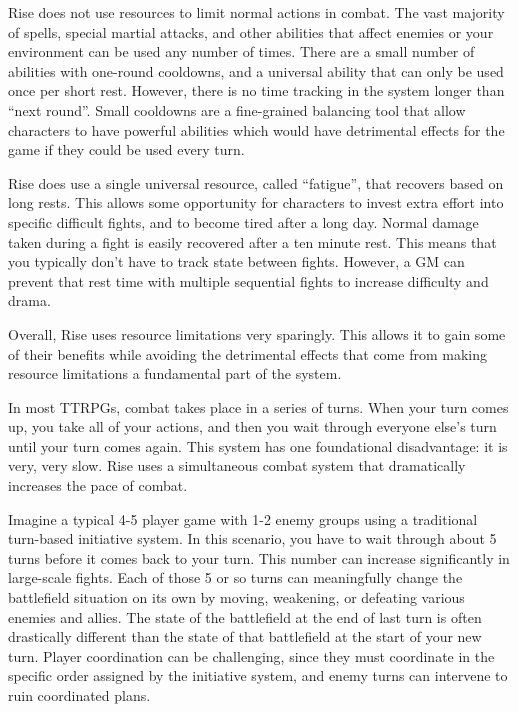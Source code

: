     Rise does not use resources to limit normal actions in combat.
    The vast majority of spells, special martial attacks, and other abilities that affect enemies or your environment can be used any number of times.
    There are a small number of abilities with one-round cooldowns, and a universal ability that can only be used once per short rest.
    However, there is no time tracking in the system longer than ``next round''.
    Small cooldowns are a fine-grained balancing tool that allow characters to have powerful abilities which would have detrimental effects for the game if they could be used every turn.

    Rise does use a single universal resource, called ``fatigue'', that recovers based on long rests.
    This allows some opportunity for characters to invest extra effort into specific difficult fights, and to become tired after a long day.
    Normal damage taken during a fight is easily recovered after a ten minute rest.
    This means that you typically don't have to track state between fights.
    However, a GM can prevent that rest time with multiple sequential fights to increase difficulty and drama.

    Overall, Rise uses resource limitations very sparingly.
    This allows it to gain some of their benefits while avoiding the detrimental effects that come from making resource limitations a fundamental part of the system.

    In most TTRPGs, combat takes place in a series of turns.
    When your turn comes up, you take all of your actions, and then you wait through everyone else's turn until your turn comes again.
    This system has one foundational disadvantage: it is very, very slow.
    Rise uses a simultaneous combat system that dramatically increases the pace of combat.

    Imagine a typical 4-5 player game with 1-2 enemy groups using a traditional turn-based initiative system.
    In this scenario, you have to wait through about 5 turns before it comes back to your turn.
    This number can increase significantly in large-scale fights.
    Each of those 5 or so turns can meaningfully change the battlefield situation on its own by moving, weakening, or defeating various enemies and allies.
    The state of the battlefield at the end of last turn is often drastically different than the state of that battlefield at the start of your new turn.
    Player coordination can be challenging, since they must coordinate in the specific order assigned by the initiative system, and enemy turns can intervene to ruin coordinated plans.

